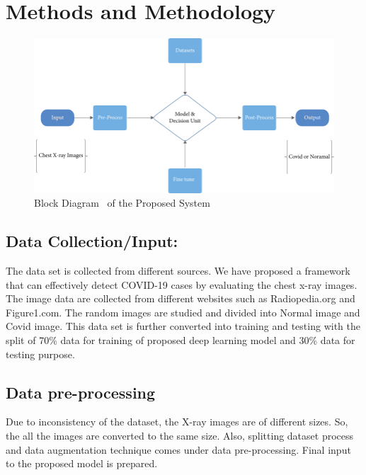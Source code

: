 \section{Methods and Methodology}

\begin{figure}[!h]
    \centering
        \includegraphics{assets/block.png}
    \caption{Block Diagram~\cite{Uddin2021} of the Proposed System}
\end{figure}

\subsection{Data Collection/Input:}

The data set is collected from different sources. We have proposed a framework that can effectively detect COVID-19 cases by evaluating the chest x-ray images. The image data are collected from different websites such as Radiopedia.org and Figure1.com. The random images are studied and divided into Normal image and Covid image. This data set is further converted into training and testing with the split of 70\% data for training of proposed deep learning model and 30\% data for testing purpose. 

\subsection{Data pre-processing }

Due to inconsistency of the dataset, the X-ray images are of different sizes. So, the all the images are converted to the same size. Also, splitting dataset process and data augmentation technique comes under data pre-processing. Final input to the proposed model is prepared. 

